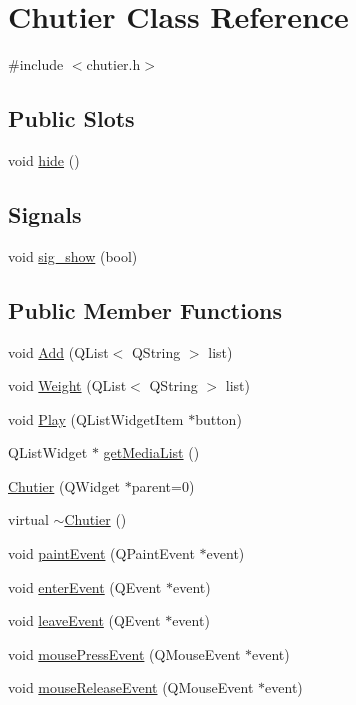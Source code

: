\hypertarget{class_chutier}{\section{\-Chutier \-Class \-Reference}
\label{class_chutier}
}


{\ttfamily \#include $<$chutier.\-h$>$}

\subsection*{\-Public \-Slots}
\begin{DoxyCompactItemize}
\item 
void \hyperlink{class_chutier_a371bb3ff033a5edf37b67eaeca109e29}{hide} ()
\end{DoxyCompactItemize}
\subsection*{\-Signals}
\begin{DoxyCompactItemize}
\item 
void \hyperlink{class_chutier_af48c7afdd6a9154410abb35afb12d723}{sig\-\_\-show} (bool)
\end{DoxyCompactItemize}
\subsection*{\-Public \-Member \-Functions}
\begin{DoxyCompactItemize}
\item 
void \hyperlink{class_chutier_af9218a9aa819faaa5f41e12982d23e83}{\-Add} (\-Q\-List$<$ \-Q\-String $>$ list)
\item 
void \hyperlink{class_chutier_a90170902ce9da77c051b61d1a5265392}{\-Weight} (\-Q\-List$<$ \-Q\-String $>$ list)
\item 
void \hyperlink{class_chutier_a743abbae7b6e2029debeb82a62bbcd0c}{\-Play} (\-Q\-List\-Widget\-Item $\ast$button)
\item 
\-Q\-List\-Widget $\ast$ \hyperlink{class_chutier_a128a5d0cdfa7c28b236e41219433a94a}{get\-Media\-List} ()
\item 
\hyperlink{class_chutier_a703afe4f6ec72bf3ca37e15cbfc44fb7}{\-Chutier} (\-Q\-Widget $\ast$parent=0)
\item 
virtual \hyperlink{class_chutier_af2f74dffd11ffe402038f373a0554021}{$\sim$\-Chutier} ()
\item 
void \hyperlink{class_chutier_a637112277c752f7b207cac4bc226df4c}{paint\-Event} (\-Q\-Paint\-Event $\ast$event)
\item 
void \hyperlink{class_chutier_a6bf1c8e7fdd33d15a5eabf275f684bd9}{enter\-Event} (\-Q\-Event $\ast$event)
\item 
void \hyperlink{class_chutier_ae27e4bb88c0b8be2e808d0a36fdf94cb}{leave\-Event} (\-Q\-Event $\ast$event)
\item 
void \hyperlink{class_chutier_a71efe3e6fbfbac809e9cad405f626981}{mouse\-Press\-Event} (\-Q\-Mouse\-Event $\ast$event)
\item 
void \hyperlink{class_chutier_ac072c22b3e0f270258ba710815e07cd0}{mouse\-Release\-Event} (\-Q\-Mouse\-Event $\ast$event)
\end{DoxyCompactItemize}
